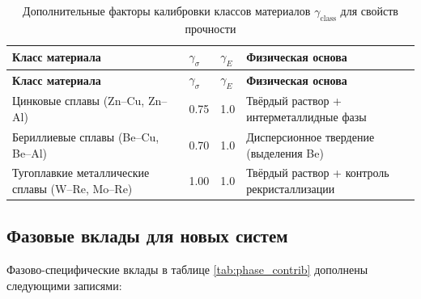 \documentclass[12pt,a4paper]{article}
\begin{document}
	\begin{longtable}{p{3.5cm} p{2.5cm} p{2.5cm} p{5cm}}
		\caption{Дополнительные факторы калибровки классов материалов $\gamma_{\text{class}}$ для свойств прочности}\label{tab:gamma_class_extended}\\
		\toprule
		\textbf{Класс материала} & $\gamma_{\sigma}$ & $\gamma_{E}$ & \textbf{Физическая основа} \\
		\midrule
		\endfirsthead
		\toprule
		\textbf{Класс материала} & $\gamma_{\sigma}$ & $\gamma_{E}$ & \textbf{Физическая основа} \\
		\midrule
		\endhead
		Цинковые сплавы (Zn–Cu, Zn–Al) & 0.75 & 1.0 & Твёрдый раствор + интерметаллидные фазы \\
		Бериллиевые сплавы (Be–Cu, Be–Al) & 0.70 & 1.0 & Дисперсионное твердение (выделения Be) \\
		Тугоплавкие металлические сплавы (W–Re, Mo–Re) & 1.00 & 1.0 & Твёрдый раствор + контроль рекристаллизации \\
		\bottomrule
	\end{longtable}
	
	\subsection*{Фазовые вклады для новых систем}
	Фазово-специфические вклады в таблице \ref{tab:phase_contrib} дополнены следующими записями:
	
\end{document}
